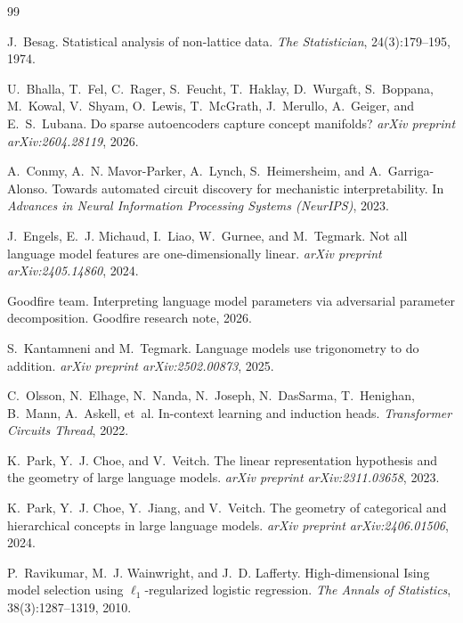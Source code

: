 \documentclass[11pt]{article}
\begin{document}
\begin{thebibliography}{99}

J.~Besag.
\newblock Statistical analysis of non-lattice data.
\newblock \emph{The Statistician}, 24(3):179--195, 1974.

U.~Bhalla, T.~Fel, C.~Rager, S.~Feucht, T.~Haklay, D.~Wurgaft,
  S.~Boppana, M.~Kowal, V.~Shyam, O.~Lewis, T.~McGrath, J.~Merullo,
  A.~Geiger, and E.~S.~Lubana.
\newblock Do sparse autoencoders capture concept manifolds?
\newblock \emph{arXiv preprint arXiv:2604.28119}, 2026.

A.~Conmy, A.~N. Mavor-Parker, A.~Lynch, S.~Heimersheim, and
  A.~Garriga-Alonso.
\newblock Towards automated circuit discovery for mechanistic
  interpretability.
\newblock In \emph{Advances in Neural Information Processing Systems
  (NeurIPS)}, 2023.

J.~Engels, E.~J. Michaud, I.~Liao, W.~Gurnee, and M.~Tegmark.
\newblock Not all language model features are one-dimensionally linear.
\newblock \emph{arXiv preprint arXiv:2405.14860}, 2024.

Goodfire team.
\newblock Interpreting language model parameters via adversarial
  parameter decomposition.
\newblock Goodfire research note, 2026.

S.~Kantamneni and M.~Tegmark.
\newblock Language models use trigonometry to do addition.
\newblock \emph{arXiv preprint arXiv:2502.00873}, 2025.

C.~Olsson, N.~Elhage, N.~Nanda, N.~Joseph, N.~DasSarma, T.~Henighan,
  B.~Mann, A.~Askell, et~al.
\newblock In-context learning and induction heads.
\newblock \emph{Transformer Circuits Thread}, 2022.

K.~Park, Y.~J. Choe, and V.~Veitch.
\newblock The linear representation hypothesis and the geometry of large
  language models.
\newblock \emph{arXiv preprint arXiv:2311.03658}, 2023.

K.~Park, Y.~J. Choe, Y.~Jiang, and V.~Veitch.
\newblock The geometry of categorical and hierarchical concepts in large
  language models.
\newblock \emph{arXiv preprint arXiv:2406.01506}, 2024.

P.~Ravikumar, M.~J. Wainwright, and J.~D. Lafferty.
\newblock High-dimensional Ising model selection using
  $\ell_1$-regularized logistic regression.
\newblock \emph{The Annals of Statistics}, 38(3):1287--1319, 2010.


\end{thebibliography}
\end{document}
